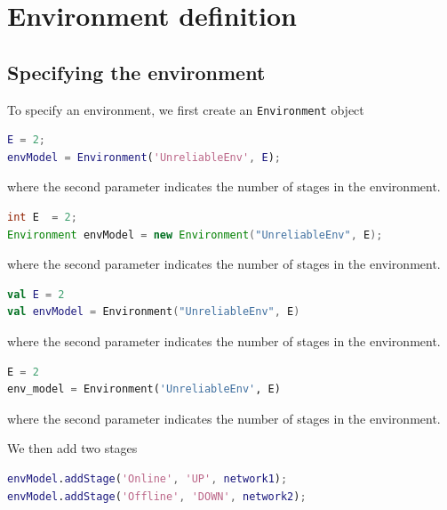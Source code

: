 
\section{Environment definition}
\label{environment-object-definition}
\subsection{Specifying the environment}

To specify an environment, we first create an \texttt{Environment} object
\begin{MATLAB}
\begin{lstlisting}[language = matlab]
E = 2;
envModel = Environment('UnreliableEnv', E);
\end{lstlisting}
where the second parameter indicates the number of stages in the environment.
\end{MATLAB}
\begin{JAVA}
\begin{lstlisting}[language = java, basicstyle=\ttfamily\scriptsize]
int E  = 2;
Environment envModel = new Environment("UnreliableEnv", E);
\end{lstlisting}
where the second parameter indicates the number of stages in the environment.
\end{JAVA}
\begin{KOTLIN}
\begin{lstlisting}[language = kotlin, basicstyle=\ttfamily\scriptsize]
val E = 2
val envModel = Environment("UnreliableEnv", E)
\end{lstlisting}
where the second parameter indicates the number of stages in the environment.
\end{KOTLIN}
\begin{PYTHON}
\begin{lstlisting}[language=python]
E = 2
env_model = Environment('UnreliableEnv', E)
\end{lstlisting}
where the second parameter indicates the number of stages in the environment.
\end{PYTHON}
We then add two stages
\begin{MATLAB}
\begin{lstlisting}[language = matlab]
envModel.addStage('Online', 'UP', network1);
envModel.addStage('Offline', 'DOWN', network2);
\end{lstlisting}
\end{MATLAB}
